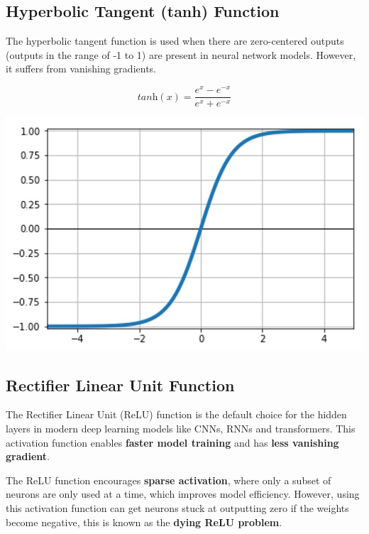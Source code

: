 \documentclass[12pt]{article}
\begin{document}
\newpage
\subsection{Hyperbolic Tangent (tanh) Function}
The hyperbolic tangent function is used when there are zero-centered outputs (outputs in the range of -1 to 1) are present in neural network models. However, it suffers from vanishing gradients.

\begin{center}
\begin{minipage}[c]{0.45\textwidth}
\[
\textit{tanh}(x) = \frac{e^x - e^{-x}}{e^x + e^{-x}}
\]
\end{minipage}
\begin{minipage}[c]{0.40\textwidth}
\centering
\includegraphics[width=\linewidth]{images/lecture_04/img_6.png}
\end{minipage}
\end{center}

\subsection{Rectifier Linear Unit Function}
The Rectifier Linear Unit (ReLU) function is the default choice for the hidden layers in modern deep learning models like CNNs, RNNs and transformers. This activation function enables \textbf{faster model training} and has \textbf{less vanishing gradient}.
\vspace{1.5em}

The ReLU function encourages \textbf{sparse activation}, where only a subset of neurons are only used at a time, which improves model efficiency. However, using this activation function can get neurons stuck at outputting zero if the weights become negative, this is known as the \textbf{dying ReLU problem}.
\end{document}
